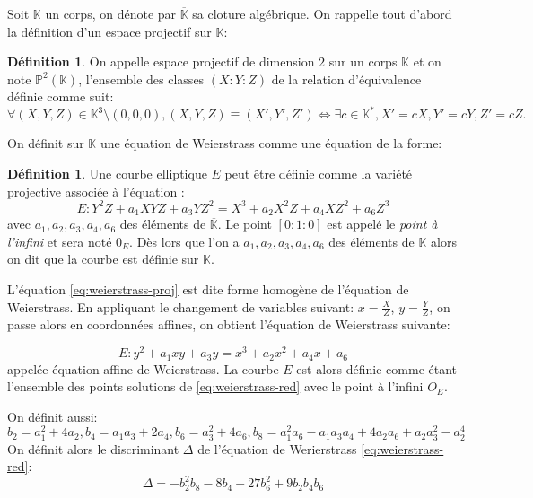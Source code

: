 \documentclass[10pt,a4paper]{book}
\theoremstyle{plain}
\theoremstyle{definition}
\theoremstyle{definition}
\theoremstyle{definition}
\theoremstyle{definition}
\newtheorem{defi}[thm]{Définition}
\theoremstyle{remark}
\theoremstyle{remark}
\begin{document}
Soit $\mathbb{K}$ un corps, on dénote par $\overline{\mathbb{K}}$ sa cloture algébrique. On rappelle tout d'abord  la définition d'un espace projectif sur $\mathbb{K}$:

\begin{defi}
On appelle espace projectif de dimension $2$ sur un corps $\mathbb{K}$ et on note $\mathbb{P}^2(\mathbb{K})$, l'ensemble des classes $(X:Y:Z)$ de la relation d'équivalence définie comme suit:
\begin{equation*}
\forall (X,Y,Z) \in \mathbb{K}^3 \setminus (0,0,0), (X,Y,Z) \equiv (X',Y',Z') \Leftrightarrow \exists c \in \mathbb{K}^*, X'=cX, Y'=cY, Z'=cZ.
\end{equation*}
\end{defi}



On définit sur $\mathbb{K}$ une équation de Weierstrass comme une équation de la forme:

\begin{defi}
Une courbe elliptique $E$ peut être définie comme la variété projective associée à l'équation :
\begin{equation}
\label{eq:weierstrass-proj}
E:Y^2Z+a_1XYZ+a_3YZ^2=X^3+a_2X^2Z+a_4XZ^2+a_6Z^3
\end{equation}
avec $a_1,a_2,a_3,a_4,a_6$ des éléments de $\overline{\mathbb{K}}$. Le point $[0:1:0]$ est appelé le \emph{point à l'infini} et sera noté $0_E$. Dès lors que l'on a $a_1,a_2,a_3,a_4,a_6$ des éléments de $\mathbb{K}$ alors on dit que la courbe est définie sur $\mathbb{K}$.
\end{defi}

L'équation \ref{eq:weierstrass-proj} est dite forme homogène de l'équation de Weierstrass. En appliquant le changement de variables suivant: $x=\frac{X}{Z}$, $y=\frac{Y}{Z}$, on passe alors en coordonnées affines, on obtient l'équation de Weierstrass suivante:

\begin{equation}
\label{eq:weierstrass-red}
E:y^2+a_1xy+a_3y=x^3+a_2x^2+a_4x+a_6
\end{equation}
appelée équation affine de Weierstrass. La courbe $E$ est alors définie comme étant l'ensemble des points solutions de \ref{eq:weierstrass-red} avec le point à l'infini $O_E$.

 On définit aussi:
\begin{equation*}
b_2=a_1^2+4a_2, b_4=a_1a_3+2a_4, b_6=a_3^2+4a_6, b_8=a_1^2a_6-a_1a_3a_4+4a_2a_6+a_2a_3^2-a_2^4
\end{equation*}
On définit alors le discriminant $\Delta$ de l'équation de Werierstrass \ref{eq:weierstrass-red}:
\begin{equation*}
\Delta = -b_2^2b_8-8b_4-27b_6^2+9b_2b_4b_6
\end{equation*}
\end{document}
